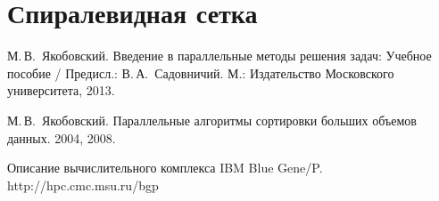 \documentclass[oneside,final,14pt]{extreport}
\begin{document}
\section*{Спиралевидная сетка}

\begin{thebibliography}{0}
        М.\,В.~Якобовский.
        Введение в параллельные методы решения задач: Учебное пособие / Предисл.: В.\,А.~Садовничий.
        М.: Издательство Московского университета, 2013.

        М.\,В.~Якобовский.
        Параллельные алгоритмы сортировки больших объемов данных.
        2004, 2008.

        Описание вычислительного комплекса IBM Blue Gene/P.
        http://hpc.cmc.msu.ru/bgp
\end{thebibliography}

\newpage
\appendix
\end{document}
